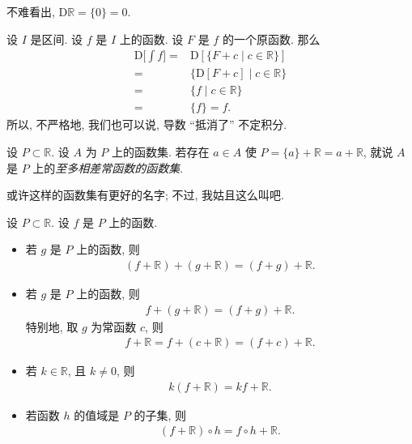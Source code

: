 \begin{example}
    不难看出, $\mathrm{D} \mathbb{R} = \{ 0 \} = 0$.
\end{example}

设 $I$ 是区间. 设 $f$ 是 $I$ 上的函数. 设 $F$ 是 $f$ 的一个原函数. 那么
\begin{align*}
    \mathrm{D} \Bigg[ \int {f} \Bigg]
    = {} & \mathrm{D} [\{ F + c \mid \text{$c \in \mathbb{R}$} \}] \\
    = {} & \{ \mathrm{D}[F + c] \mid \text{$c \in \mathbb{R}$} \}  \\
    = {} & \{ f \mid \text{$c \in \mathbb{R}$} \}                  \\
    = {} & \{ f \}  = f.
\end{align*}
所以, 不严格地, 我们也可以说, 导数 ``抵消了'' 不定积分.

\begin{definition}
    设 $P \subset \mathbb{R}$. 设 $A$ 为 $P$ 上的函数集. 若存在 $a \in A$ 使 $P = \{ a \} + \mathbb{R} = a + \mathbb{R}$, 就说 $A$ 是 $P$ 上的\emph{至多相差常函数的函数集}.
\end{definition}

\begin{remark}
    或许这样的函数集有更好的名字; 不过, 我姑且这么叫吧.
\end{remark}

\begin{theorem}
    设 $P \subset \mathbb{R}$. 设 $f$ 是 $P$ 上的函数.
    \begin{itemize}
        \item 若 $g$ 是 $P$ 上的函数, 则
              \begin{align*}
                  (f + \mathbb{R}) + (g + \mathbb{R}) = (f + g) + \mathbb{R}.
              \end{align*}
        \item 若 $g$ 是 $P$ 上的函数, 则
              \begin{align*}
                  f + (g + \mathbb{R}) = (f + g) + \mathbb{R}.
              \end{align*}
              特别地, 取 $g$ 为常函数 $c$, 则
              \begin{align*}
                  f + \mathbb{R} = f + (c + \mathbb{R}) = (f + c) + \mathbb{R}.
              \end{align*}
        \item 若 $k \in \mathbb{R}$, 且 $k \neq 0$, 则
              \begin{align*}
                  k(f + \mathbb{R}) = kf + \mathbb{R}.
              \end{align*}
        \item 若函数 $h$ 的值域是 $P$ 的子集, 则
              \begin{align*}
                  (f + \mathbb{R}) \circ h = f \circ h + \mathbb{R}.
              \end{align*}
    \end{itemize}
\end{theorem}

